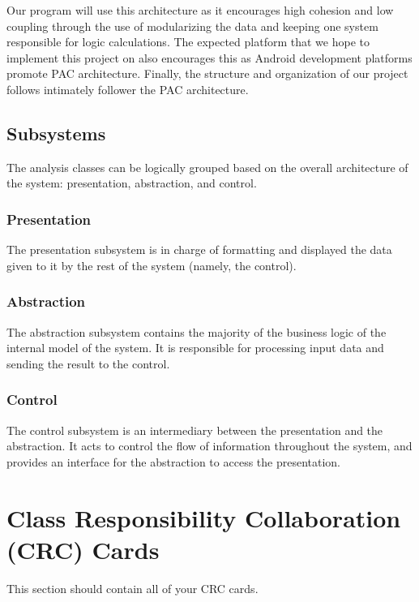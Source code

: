 \documentclass[]{article}
\begin{document}
Our program will use this architecture as it encourages high cohesion and low coupling
through the use of modularizing the data and keeping one system responsible for logic calculations.
The expected platform that we hope to implement this project on also encourages this as
Android development platforms promote PAC architecture. Finally, the structure and
organization of our project follows intimately follower the PAC architecture.


\subsection{Subsystems}
\label{sub:subsystems}

The analysis classes can be logically grouped based on the overall architecture
of the system: presentation, abstraction, and control.

\subsubsection{Presentation}

The presentation subsystem is in charge of formatting and displayed the data given
to it by the rest of the system (namely, the control).

\subsubsection{Abstraction}

The abstraction subsystem contains the majority of the business logic of the
internal model of the system. It is responsible for processing input data and
sending the result to the control.

\subsubsection{Control}

The control subsystem is an intermediary between the presentation and the
abstraction. It acts to control the flow of information throughout the system,
and provides an interface for the abstraction to access the presentation.


	
\section{Class Responsibility Collaboration (CRC) Cards}
\label{sec:class_responsibility_collaboration_crc_cards}
This section should contain all of your CRC cards.
\end{document}
